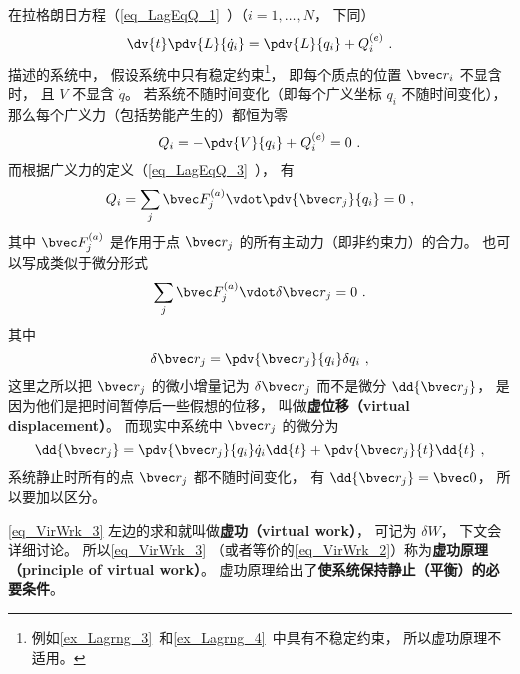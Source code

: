
\begin{issues}
\issueTODO
\end{issues}


在拉格朗日方程（\autoref{eq_LagEqQ_1}~）（$i=1,\dots,N$， 下同）
\begin{equation}\label{eq_VirWrk_1}
\dv{t} \pdv{L}{\dot q_i} = \pdv{L}{q_i} + Q_i^{(e)}~.
\end{equation}
描述的系统中， 假设系统中只有稳定约束\footnote{例如\autoref{ex_Lagrng_3}~和\autoref{ex_Lagrng_4}~中具有不稳定约束， 所以虚功原理不适用。}， 即每个质点的位置 $\bvec r_i$ 不显含时， 且 $V$ 不显含 $\dot q$。 若系统不随时间变化（即每个广义坐标 $q_i$ 不随时间变化）， 那么每个广义力（包括势能产生的）都恒为零
\begin{equation}\label{eq_VirWrk_2}
Q_i = -\pdv{V}{q_i} + Q_i^{(e)} = 0~.
\end{equation}
而根据广义力的定义（\autoref{eq_LagEqQ_3}~）， 有
\begin{equation}
Q_i = \sum_j \bvec F_j^{(a)} \vdot \pdv{\bvec r_j}{q_i} = 0~,
\end{equation}
其中 $\bvec F_j^{(a)}$ 是作用于点 $\bvec r_j$ 的所有主动力（即非约束力）的合力。 也可以写成类似于微分形式
\begin{equation}\label{eq_VirWrk_3}
\sum_j \bvec F_j^{(a)} \vdot \delta \bvec r_j = 0~.
\end{equation}
其中
\begin{equation}
\delta \bvec r_j = \pdv{\bvec r_j}{q_i}\delta{q_i}~,
\end{equation}
这里之所以把 $\bvec r_j$ 的微小增量记为 $\delta \bvec r_j$ 而不是微分 $\dd{\bvec r_j}$， 是因为他们是把时间暂停后一些假想的位移， 叫做\textbf{虚位移（virtual displacement）}。 而现实中系统中 $\bvec r_j$ 的微分为
\begin{equation}
\dd{\bvec r_j} = \pdv{\bvec r_j}{q_i}\dot{q}_i\dd{t} + \pdv{\bvec r_j}{t}\dd{t}~,
\end{equation}
系统静止时所有的点 $\bvec r_j$ 都不随时间变化， 有 $\dd{\bvec r_j} = \bvec 0$， 所以要加以区分。

\autoref{eq_VirWrk_3} 左边的求和就叫做\textbf{虚功（virtual work）}， 可记为 $\delta W$， 下文会详细讨论。 所以\autoref{eq_VirWrk_3} （或者等价的\autoref{eq_VirWrk_2}）称为\textbf{虚功原理（principle of virtual work）}。 虚功原理给出了\textbf{使系统保持静止（平衡）的必要条件}。

